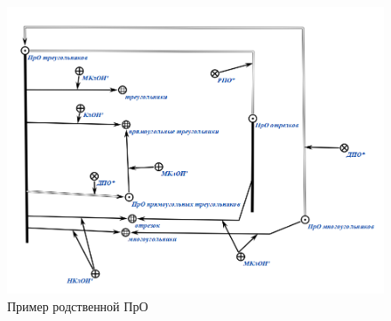 \begin{frame}{\\}
	\begin{figure}[H]
		\includegraphics[scale=0.4]{./part1/pictures/RPO.png}
		\caption{Пример родственной ПрО}
	\end{figure}

\end{frame}